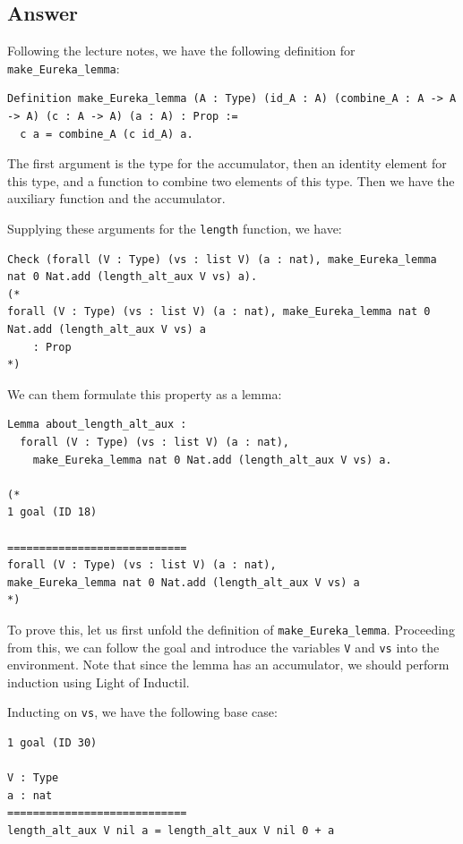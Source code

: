 \documentclass{article}
\begin{document}
\subsection{Answer}

Following the lecture notes, we have the following definition for \texttt{make\_Eureka\_lemma}:

\begin{lstlisting}
Definition make_Eureka_lemma (A : Type) (id_A : A) (combine_A : A -> A -> A) (c : A -> A) (a : A) : Prop :=
  c a = combine_A (c id_A) a.
\end{lstlisting}

The first argument is the type for the accumulator, then an identity element for this type, and a function to combine two elements of this type. Then we have the auxiliary function and the accumulator.

Supplying these arguments for the \texttt{length} function, we have:

\begin{lstlisting}
Check (forall (V : Type) (vs : list V) (a : nat), make_Eureka_lemma nat 0 Nat.add (length_alt_aux V vs) a).
(*
forall (V : Type) (vs : list V) (a : nat), make_Eureka_lemma nat 0 Nat.add (length_alt_aux V vs) a
    : Prop
*)
\end{lstlisting}

We can them formulate this property as a lemma:

\begin{lstlisting}
Lemma about_length_alt_aux :
  forall (V : Type) (vs : list V) (a : nat),
    make_Eureka_lemma nat 0 Nat.add (length_alt_aux V vs) a.

(* 
1 goal (ID 18)

============================
forall (V : Type) (vs : list V) (a : nat),
make_Eureka_lemma nat 0 Nat.add (length_alt_aux V vs) a
*)
\end{lstlisting}

To prove this, let us first unfold the definition of \texttt{make\_Eureka\_lemma}. Proceeding from this, we can follow the goal and introduce the variables \texttt{V} and \texttt{vs} into the environment. Note that since the lemma has an accumulator, we should perform induction using Light of Inductil. 

Inducting on \texttt{vs}, we have the following base case:

\begin{lstlisting}
1 goal (ID 30)

V : Type
a : nat
============================
length_alt_aux V nil a = length_alt_aux V nil 0 + a
\end{lstlisting}
\end{document}
